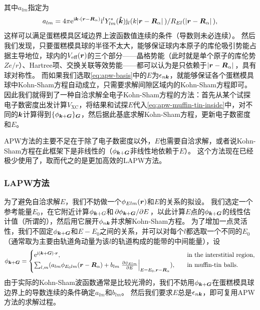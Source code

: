 其中$a_{lm}$指定为
\begin{equation}
    a_{lm} = 4 \pi \mathrm{e}^{\mathrm{i} \vb*{k} \cdot (\vb*{r} - \vb*{R}_\alpha)} \mathrm{i}^l Y_{lm}^*(\vu*{k}) \mathrm{j}_{l}(k \abs*{\vb*{r} - \vb*{R}_\alpha}) / R_{El} (\abs*{\vb*{r} - \vb*{R}_\alpha}),
\end{equation}
这样可以满足蛋糕模具区域边界上波函数值连续的条件（导数则未必连续）。
然后我们发现，只要蛋糕模具球的半径不太大，能够保证球内本原子的库伦吸引势能占据主导地位，球内的$V_\text{eff}(\vb*{r})$的三个部分——晶格势能（此时就是单个原子的库伦势$Z e / r$）、Hartree项、交换关联等效势能——都可以认为是只依赖于$\abs*{\vb*{r} - \vb*{R}_\alpha}$，具有球对称性。
而如果我们选取\eqref{eq:apw-basis}中的$E$为$\epsilon_{n \vb*{k}}$，就能够保证各个蛋糕模具球中Kohn-Sham方程自动成立，只需要求解间隙区域内的Kohn-Sham方程即可。
因此我们就得到了一种自洽求解全电子Kohn-Sham方程的方法：首先从某个试探电子数密度出发计算$V_\text{XC}$，将结果和试探$E$代入\eqref{eq:apw-muffin-tin-inside}中，对不同的$\vb*{k}$计算得到$\{\phi_{\vb*{k}+\vb*{G}}\}_{\vb*{G}}$，然后据此基底求解Kohn-Sham方程，更新电子数密度和$E$。

APW方法的主要不足在于除了电子数密度以外，$E$也需要自洽求解，或者说Kohn-Sham方程在此框架下是非线性的（$\phi_{\vb*{k} + \vb*{G}}$非线性地依赖于$E$）。
这个方法现在已经极少使用了，取而代之的是更加高效的LAPW方法。

\subsubsection{LAPW方法}

为了避免自洽求解$E$，我们不妨做一个$\phi_{Elm}(\vb*{r})$和$E$的关系的拟设。
我们选定一个参考能量$E_0$，在它附近计算$\phi_{\vb*{k}+G}$和$\pdv*{\phi_{\vb*{k}+\vb*{G}}}{E}$，以此计算$E$点的$\phi_{\vb*{k}+\vb*{G}}$的线性估计值（所谓的），然后用它展开$\phi_{n \vb*{k}}$并求解Kohn-Sham方程。
为了增加一点灵活性，我们不固定$\phi_{\vb*{k} + \vb*{G}}$和$E - E_0$之间的关系，并可以对每个$l$都选取一个不同的$E_0$（通常取为主要由轨道角动量为该$l$的轨道构成的能带的中间能量），设
\begin{equation}
    \phi_{\vb*{k} + \vb*{G}} = \begin{cases}
        \ee^{\ii (\vb*{k} + \vb*{G}) \cdot \vb*{r}}, \quad &\text{in the interstitial region}, \\
        \sum_{l, m} ( a_{lm} \phi_{E_0 lm}(\vb*{r} - \vb*{R}_\alpha) + b_{lm} \eval{\pdv{\phi_{Elm}}{E}}_{E=E_0, \vb*{r} - \vb*{R}_\alpha} ) , \quad &\text{in muffin-tin balls}.
    \end{cases}
\end{equation}
由于实际的Kohn-Sham波函数通常是比较光滑的，我们不妨用$\phi_{\vb*{k} + \vb*{G}}$在蛋糕模具球边界上的导数连续的条件确定$a_{lm}$和$b_{lm}$。
然后我们要求$E$总是$\epsilon_{n \vb*{k}}$，即可复用APW方法的求解过程。

